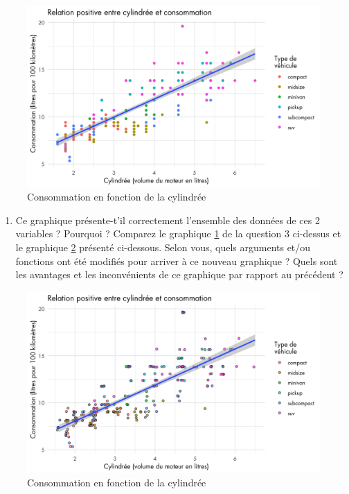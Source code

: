 \documentclass[a4paperpaper,]{article}
\providecommand{\tightlist}{%
  \setlength{\itemsep}{0pt}\setlength{\parskip}{0pt}}
\theoremstyle{definition}
\theoremstyle{definition}
\theoremstyle{definition}
\theoremstyle{remark}
\begin{document}
\begin{figure}[htpb]

{\centering \includegraphics[width=0.9\linewidth]{figure/consommation-1} 

}

\caption{Consommation en fonction de la cylindrée}\label{fig:consommation}
\end{figure}

\begin{enumerate}
\def\labelenumi{\arabic{enumi}.}
\setcounter{enumi}{3}
\tightlist
\item
  Ce graphique présente-t'il correctement l'ensemble des données de ces
  2 variables ? Pourquoi ? Comparez le graphique \ref{fig:consommation}
  de la question 3 ci-dessus et le graphique \ref{fig:consommation2}
  présenté ci-dessous. Selon vous, quels arguments et/ou fonctions ont
  été modifiés pour arriver à ce nouveau graphique ? Quels sont les
  avantages et les inconvénients de ce graphique par rapport au
  précédent ?
\end{enumerate}

\begin{figure}[htpb]

{\centering \includegraphics[width=0.9\linewidth]{figure/consommation2-1} 

}

\caption{Consommation en fonction de la cylindrée}\label{fig:consommation2}
\end{figure}
\end{document}
